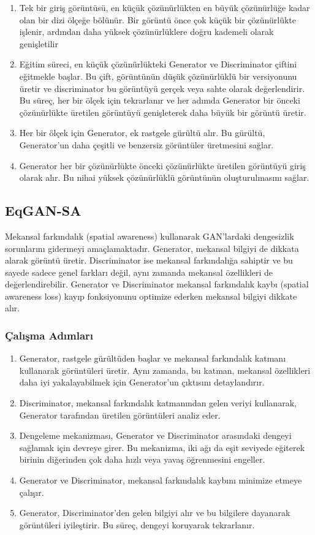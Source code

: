 \begin{enumerate}
    \item Tek bir giriş görüntüsü, en küçük çözünürlükten en büyük çözünürlüğe kadar olan bir dizi ölçeğe bölünür. Bir görüntü önce çok küçük bir çözünürlükte işlenir, ardından daha yüksek çözünürlüklere doğru kademeli olarak genişletilir
    \item Eğitim süreci, en küçük çözünürlükteki Generator ve Discriminator çiftini eğitmekle başlar. Bu çift, görüntünün düşük çözünürlüklü bir versiyonunu üretir ve discriminator bu görüntüyü gerçek veya sahte olarak değerlendirir. Bu süreç, her bir ölçek için tekrarlanır ve her adımda Generator bir önceki çözünürlükte üretilen görüntüyü genişleterek daha büyük bir görüntü üretir.
    \item Her bir ölçek için Generator, ek rastgele gürültü alır. Bu gürültü, Generator'un daha çeşitli ve benzersiz görüntüler üretmesini sağlar.
    \item Generator her bir çözünürlükte önceki çözünürlükte üretilen görüntüyü giriş olarak alır. Bu nihai yüksek çözünürlüklü görüntünün oluşturulmasını sağlar.
\end{enumerate}

\subsection{EqGAN-SA}

Mekansal farkındalık (spatial awareness) kullanarak GAN'lardaki dengesizlik sorunlarını gidermeyi amaçlamaktadır. Generator, mekansal bilgiyi de dikkata alarak görüntü üretir. Discriminator ise mekansal farkındalığa sahiptir ve bu sayede sadece genel farkları değil, aynı zamanda mekansal özellikleri de değerlendirebilir. Generator ve Discriminator mekansal farkındalık kaybı (spatial awareness loss) kayıp fonksiyonunu optimize ederken mekansal bilgiyi dikkate alır.

\subsubsection{Çalışma Adımları}

\begin{enumerate}
    \item Generator, rastgele gürültüden başlar ve mekansal farkındalık katmanı kullanarak görüntüleri üretir. Aynı zamanda, bu katman, mekansal özellikleri daha iyi yakalayabilmek için Generator'un çıktısını detaylandırır.
    \item Discriminator, mekansal farkındalık katmanından gelen veriyi kullanarak, Generator tarafından üretilen görüntüleri analiz eder.
    \item Dengeleme mekanizması, Generator ve Discriminator arasındaki dengeyi sağlamak için devreye girer. Bu mekanizma, iki ağı da eşit seviyede eğiterek birinin diğerinden çok daha hızlı veya yavaş öğrenmesini engeller.
    \item Generator ve Discriminator, mekansal farkındalık kaybını minimize etmeye çalışır.
    \item Generator, Discriminator'den gelen bilgiyi alır ve bu bilgilere dayanarak görüntüleri iyileştirir. Bu süreç, dengeyi koruyarak tekrarlanır.
\end{enumerate}

